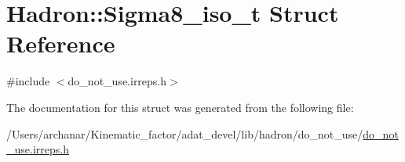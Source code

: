 \hypertarget{structHadron_1_1Sigma8__iso__t}{}\section{Hadron\+:\+:Sigma8\+\_\+iso\+\_\+t Struct Reference}
\label{structHadron_1_1Sigma8__iso__t}


{\ttfamily \#include $<$do\+\_\+not\+\_\+use.\+irreps.\+h$>$}



The documentation for this struct was generated from the following file\+:\begin{DoxyCompactItemize}
\item 
/\+Users/archanar/\+Kinematic\+\_\+factor/adat\+\_\+devel/lib/hadron/do\+\_\+not\+\_\+use/\mbox{\hyperlink{do__not__use_8irreps_8h}{do\+\_\+not\+\_\+use.\+irreps.\+h}}\end{DoxyCompactItemize}
